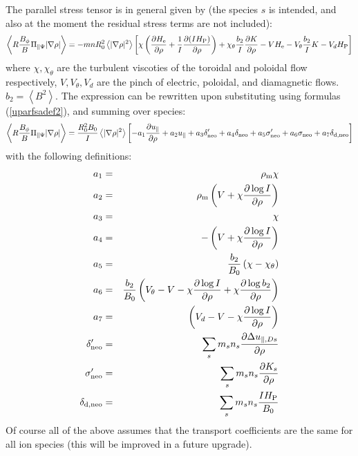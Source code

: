 The parallel stress tensor is in general given by (the species $s$ is intended, and also at the moment the residual stress terms are not included):
\begin{eqnarray}
\left\langle R \frac{B_{\phi}}{B} \Pi_{\parallel\Psi}
|\nabla{\rho}| \right\rangle=-m n R_0^2\left\langle |\nabla{\rho}|^2 \right\rangle \left[\chi \left(\frac{\partial H_{\rm e}}{\partial\rho}+\frac{1}{I}\frac{\partial (I H_{\rm P})}{\partial\rho}\right)+\chi_\theta \frac{b_2}{I}\frac{\partial K}{\partial\rho}-V H_{\rm e}-V_\theta \frac{b_2}{I} K -V_d H_{\rm P}\right]
\label{parallelstresstensor}
\end{eqnarray} 
where $\chi,\chi_\theta$ are the turbulent viscoties of the toroidal and poloidal flow respectively, $V,V_\theta,V_d$ are the pinch of electric, poloidal, and diamagnetic flows. $b_2=\left\langle B^2 \right\rangle$.
The expression can be rewritten upon substituting using formulas (\ref{uparfsadef2}), and summing over species:
\begin{eqnarray}
\left\langle R \frac{B_{\phi}}{B} \Pi_{\parallel\Psi}
|\nabla{\rho}| \right\rangle= \frac{R_0^2 B_0}{I} \left\langle |\nabla{\rho}|^2 \right\rangle \left[-a_1 \frac{\partial u_\parallel}{\partial\rho}+a_2u_\parallel+a_3\delta_{\rm neo}'+a_4\delta_{\rm neo} +a_5 \sigma_{\rm neo}'+a_6\sigma_{\rm neo}+a_7 \delta_{\rm d,neo}\right]
\label{parallelstresstensor2}
\end{eqnarray} 
with the following definitions:
\begin{eqnarray}
a_1 &=& \rho_{\rm m} \chi
\nonumber \\
a_2 &=& \rho_{\rm m} \left(V+\chi \frac{\partial \log{I}}{\partial \rho}  \right)
\nonumber \\
a_3 &=& \chi
\nonumber \\
a_4 &=& -\left(V+\chi \frac{\partial \log{I}}{\partial \rho}  \right)
\nonumber \\
a_5 &=& \frac{b_2}{B_0}\left(\chi-\chi_\theta \right)
\nonumber \\
a_6 &=& \frac{b_2}{B_0}\left(V_\theta-V-\chi \frac{\partial \log{I}}{\partial \rho}+\chi\frac{\partial \log{b_2}}{\partial \rho} \right)
\nonumber \\
a_7 &=& \left(V_d-V-\chi\frac{\partial \log{I}}{\partial \rho}  \right)
\nonumber \\
\delta_{\rm neo}' &=& \sum_s m_s n_s \frac{\partial \Delta u_{\parallel,Ds}}{\partial\rho}
\nonumber \\
\sigma_{\rm neo}' &=& \sum_s m_s n_s \frac{\partial K_s}{\partial\rho} 
\nonumber \\
\delta_{\rm d,neo} &=& \sum_s m_s n_s \frac{I H_{\rm P}}{B_0}  
\label{stresstensorparperp2quantities}
\end{eqnarray} 
Of course all of the above assumes that the transport coefficients are the same for all ion species (this will be improved in a future upgrade).

